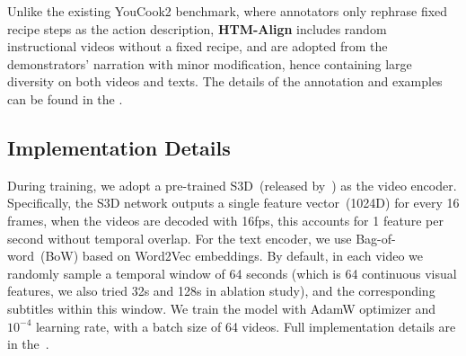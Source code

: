 Unlike the existing YouCook2 benchmark, 
where annotators only rephrase fixed recipe steps as the action description,
\textbf{HTM-Align} includes random instructional videos without a fixed recipe,
and are adopted from the demonstrators' narration with minor modification,
hence containing large diversity on both videos and texts.
The details of the annotation and examples can be found in the \app. 

\vspace{-2mm}
\subsection{Implementation Details}
\vspace{-2mm}
\label{sec:imp}
During training, 
we adopt a pre-trained S3D~(released by~\cite{Miech20}) as the video encoder.
Specifically, 
the S3D network outputs a single feature vector~(1024D) for every 16 frames, 
when the videos are decoded with 16fps, 
this accounts for 1 feature per second without temporal overlap.
For the text encoder, we use Bag-of-word~(BoW) based on Word2Vec embeddings.
By default, in each video we randomly sample a temporal window of 64 seconds 
(which is 64 continuous visual features, we also tried 32s and 128s in ablation study), 
and the corresponding subtitles within this window.
We train the model with AdamW optimizer and $10^{-4}$ learning rate, 
with a batch size of 64 videos.
Full implementation details are in the~\app. \\[-8pt]

\begin{comment}
\textbf{CrossTask}~\cite{Zhukov2019} 
includes 18 tasks and 2.7k instructional videos with manually annotated action segments. 
Each video may contain multiple segments, corresponding to different actions. 
It also provides an ordered list of action steps with short natural language descriptions for each task. 
We apply our model trained only on HowTo100M to the problem of step localization by computing similarity between every short clip in the video and the action label names of CrossTask. 
We use the same recall metric as in~\cite{Zhukov2019}, 
which is defined by the number of step assignments that fall into the correct ground truth interval, 
divided by the total number of steps in the video. 
Videos from the test set of CrossTask are removed from the HowTo100M training set to ensure 
that they are not observed at training time.
\end{comment}

\begin{comment}
We manually annotate a small subset of HowTo100M videos for testing. 
Annotators are given the video and the corresponding subtitles with start and end timestamps, and annotate if each subtitle is align-able with the video (True/False) and modify the subtitle time stamps to cover the corresponding video segment.
We quantitatively and qualitatively show our performance on xxx. 
\end{comment}

